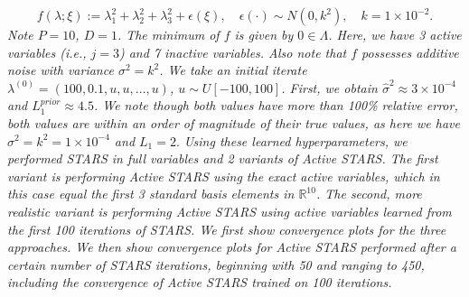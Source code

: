 \documentclass{amsart}
\newcommand{\R}{\mathbb{R}}
\begin{document}
$$f(\lambda; \xi):=\lambda_{1}^2+\lambda_{2}^2+\lambda_{3}^2 + \epsilon(\xi),  \quad \epsilon(\cdot) \sim N(0,k^2), \quad k=1 \times 10^{-2}.$$ \textit{Note $P=10$, $D=1$. The minimum of $f$ is given by $0 \in \Lambda$. Here, we have 3 active variables (i.e., $j=3$) and 7 inactive variables. Also note that $f$ possesses additive  noise with variance $\sigma^2=k^2$. We take an initial iterate $\lambda^{(0)}=(100,0.1,u,u,\ldots,u)$, $u \sim U[-100,100]$. First, we obtain $\hat{\sigma}^2 \approx 3 \times 10^{-4}$ and $L_1^{prior} \approx 4.5$. We note though both values have more than 100\% relative error, both values are within an order of magnitude of their true values, as here we have $\sigma^2=k^2=1\times10^{-4}$ and $L_1=2.$ Using these learned hyperparameters, we performed STARS in full variables and 2 variants of Active STARS. The first variant is performing Active STARS using the exact active variables, which in this case equal the first 3 standard basis elements in $\R^{10}$. The second, more realistic variant is performing Active STARS using active variables learned from the first 100 iterations of STARS. We first show convergence plots for the three approaches.  We then show convergence plots for Active STARS performed after a certain number of STARS iterations, beginning with 50 and ranging to 450, including the convergence of Active STARS trained on 100 iterations. }
\end{document}
